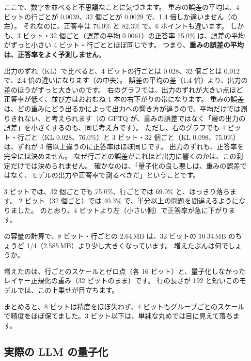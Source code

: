 ここで、数字を並べると不思議なことに気づきます。
重みの誤差の平均は、4 ビットの行ごとが 0.0039、32 個ごとが 0.0029 で、1.4 倍しか違いません（の左）。
それなのに、正答率は 76.0\% と 82.3\% で、6 ポイントも違います。
しかも、3 ビット・32 個ごと（誤差の平均 0.0061）の正答率 75.0\% は、誤差の平均がずっと小さい 4 ビット・行ごととほぼ同じです。
つまり、\textbf{重みの誤差の平均は、正答率をよく予測しません}。

出力のずれ（KL）で比べると、4 ビットの行ごとは 0.028、32 個ごとは 0.012 で、2.4 倍の違いになります（の中央）。
誤差の平均の差（1.4 倍）より、出力の差のほうがずっと大きいのです。
右のグラフでは、出力のずれが大きい点ほど正答率が低く、並び方はおおむね 1 本の右下がりの帯になります。
重みの誤差は、どの重みにどう出るかによって出力への響き方が違うので、平均だけでは測りきれない、と考えられます（の GPTQ が、重みの誤差ではなく「層の出力の誤差」を小さくするのも、同じ考え方です）。
ただし、右のグラフでも 4 ビット・行ごと（KL 0.028、76.0\%）と 3 ビット・32 個ごと（KL 0.098、75.0\%）は、ずれが 3 倍以上違うのに正答率はほぼ同じです。
出力のずれも、正答率を完全には決めません。
なぜ行ごとの誤差がこれほど出力に響くのかは、この測定だけでは決められません。
確かなのは、「量子化の良し悪しは、重みの誤差ではなく、モデルの出力や正答率で測るべきだ」ということです。

3 ビットでは、32 個ごとでも 75.0\%、行ごとでは 69.0\% と、はっきり落ちます。
2 ビット（32 個ごと）では 40.3\% で、半分以上の問題を間違えるようになりました。
のとおり、4 ビットより左（小さい側）で正答率が急に下がります。

\begin{quiz}
 の容量の計算で、8 ビット・行ごとの 2.64\,MB は、32 ビットの 10.34\,MB のちょうど 1/4（2.585\,MB）より少し大きくなっています。
増えたぶんは何でしょうか。
\end{quiz}

増えたのは、行ごとのスケールとゼロ点（各 16 ビット）と、量子化しなかったレイヤー正規化の重み（32 ビットのまま）です。
行の長さが 192 と短いこのモデルでは、この上乗せが目立ちます。

まとめると、8 ビットは精度をほぼ失わず、4 ビットもグループごとのスケールで精度をほぼ保てました。3 ビット以下は、単純な丸めでは目に見えて落ちます。


\subsection{実際の LLM の量子化}\label{sec:distill-quant-llm}

